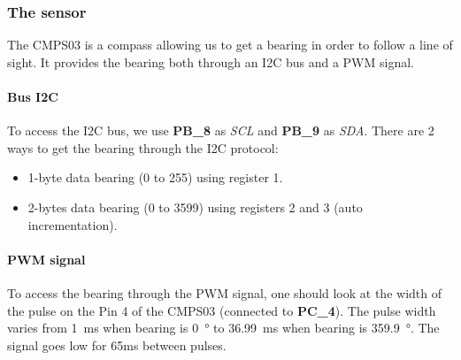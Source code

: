 \subsubsection{The sensor}

The CMPS03 is a compass allowing us to get a bearing in order to follow a line of sight.
It provides the bearing both through an I2C bus and a PWM signal.

\paragraph{Bus I2C}
To access the I2C bus, we use \textbf{PB\_8} as \textit{SCL} and \textbf{PB\_9} as \textit{SDA}.
There are 2 ways to get the bearing through the I2C protocol:
\begin{itemize}
  \item 1-byte data bearing (0 to 255) using register 1.
  \item 2-bytes data bearing (0 to 3599) using registers 2 and 3 (auto  incrementation).
\end{itemize}

\paragraph{PWM signal}
To access the bearing through the PWM signal, one should look at the width of the pulse on the Pin 4 of the CMPS03 (connected to \textbf{PC\_4}).
The pulse width varies from \SI{1}{ms} when bearing is \SI{0}{\degree} to \SI{36.99}{ms} when bearing is \SI{359.9}{\degree}. The signal goes low for 65ms between pulses.
